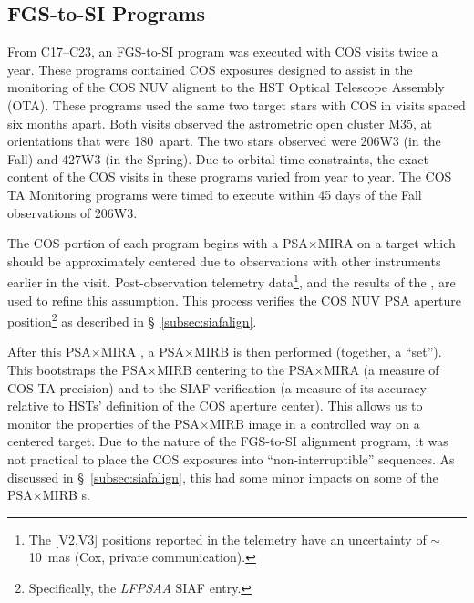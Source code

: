 \subsection{FGS-to-SI Programs}\label{subsec:fgs2si}
From C17--C23, an FGS-to-SI program was executed with COS visits twice a year. These programs contained COS exposures designed to assist in the monitoring of the COS NUV alignent to the HST Optical Telescope Assembly (OTA).
These programs used the same two target stars with COS in visits spaced six months apart. Both visits observed the astrometric open cluster M35, at orientations that were 180\degree~apart.
The two stars observed were 206W3 (in the Fall) and 427W3 (in the Spring). Due to orbital time constraints, the exact content of the COS visits in these programs varied from year to year.
The COS TA Monitoring programs were timed to execute within 45 days of the Fall observations of 206W3.

The COS portion of each program begins with a PSA$\times$MIRA  on a target which should be approximately centered due to observations with other instruments earlier in the visit.
Post-observation telemetry data\footnote{The [V2,V3] positions reported in the telemetry have an uncertainty of $\sim$ 10~mas (Cox, private communication).}, and the results of the , are used to refine this assumption.
This process verifies the COS NUV PSA aperture position\footnote{Specifically, the \textit{LFPSAA} SIAF entry.} as described in \S~\ref{subsec:siafalign}.

After this PSA$\times$MIRA , a PSA$\times$MIRB  is then performed (together, a ``set'').
This bootstraps the PSA$\times$MIRB centering to the PSA$\times$MIRA (a measure of COS TA precision) and to the SIAF verification (a measure of its accuracy relative to HSTs' definition of the COS aperture center).
This allows us to monitor the properties of the PSA$\times$MIRB image in a controlled way on a centered target.
Due to the nature of the FGS-to-SI alignment program, it was not practical to place the COS exposures into ``non-interruptible'' sequences.
As discussed in \S~\ref{subsec:siafalign}, this had some minor impacts on some of the PSA$\times$MIRB s.

